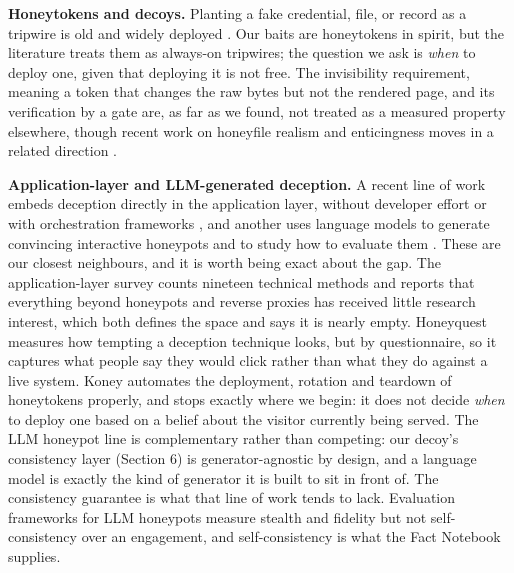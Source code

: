 \textbf{Honeytokens and decoys.} Planting a fake credential, file, or record as a
tripwire is old and widely deployed
\cite{yuill2004honeyfiles,bowen2009baiting,juels2013honeywords}. Our baits are
honeytokens in spirit, but the literature treats them as always-on tripwires; the
question we ask is \emph{when} to deploy one, given that deploying it is not free. The
invisibility requirement, meaning a token that changes the raw bytes but not the
rendered page, and its verification by a gate are, as far as we found, not treated as a
measured property elsewhere, though recent work on honeyfile realism and
enticingness moves in a related direction
\cite{kahlhofer2024honeyquest}.

\textbf{Application-layer and LLM-generated deception.} A recent line of work embeds
deception directly in the application layer, without developer effort or with
orchestration frameworks
\cite{kahlhofer2024applayer,kahlhofer2025koney}, and another uses language models
to generate convincing interactive honeypots and to study how to evaluate them
\cite{sladic2024shellm,reworr2024llmagent,bridges2025sok,vero2026honeyval}.
These are our closest neighbours, and it is worth being exact about the gap. The
application-layer survey \cite{kahlhofer2024applayer} counts nineteen technical
methods and reports that everything beyond honeypots and reverse proxies has
received little research interest, which both defines the space and says it is
nearly empty. Honeyquest \cite{kahlhofer2024honeyquest} measures how tempting a
deception technique looks, but by questionnaire, so it captures what people say
they would click rather than what they do against a live system. Koney
\cite{kahlhofer2025koney} automates the deployment, rotation and teardown of
honeytokens properly, and stops exactly where we begin: it does not decide \emph{when}
to deploy one based on a belief about the visitor currently being served. The LLM
honeypot line is complementary rather than competing: our decoy's consistency layer
(Section 6) is generator-agnostic by design, and a language model is exactly the
kind of generator it is built to sit in front of. The consistency guarantee is what that
line of work tends to lack. Evaluation frameworks for LLM honeypots measure
stealth and fidelity \cite{vero2026honeyval} but not self-consistency over an
engagement, and self-consistency is what the Fact Notebook supplies.

